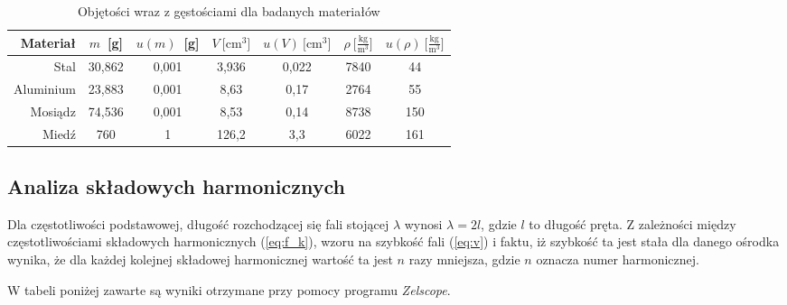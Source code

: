 \documentclass[12pt,a4paper]{article}
\numberwithin{equation}{section}
\begin{document}
\begin{table}[!ht]
	\caption{Objętości wraz z gęstościami dla badanych materiałów}
	\begin{center}
		\begin{tabular}{r|c|c|c|c|c|c}
			\hline  \rule{0pt}{18pt} 
			Materiał & $m$~[g] & $u(m)$~[g] & $V~\big[\textrm{cm}^3\big]$ & $u(V)~\big[\textrm{cm}^3\big]$ & $\rho~\Big[\frac{\textrm{kg}}{\textrm{m}^3}\Big]$ & $u(\rho)~\Big[\frac{\textrm{kg}}{\textrm{m}^3}\Big]$ \\[3pt] \hline \hline
			Stal & 30,862 & 0,001 & 3,936 & 0,022 & 7840 & 44  \\
			Aluminium & 23,883 & 0,001 & 8,63 & 0,17 &  2764 & 55  \\
			Mosiądz & 74,536 & 0,001 &  8,53 & 0,14 & 8738 & 150   \\
			Miedź & 760 & 1 & 126,2 & 3,3 & 6022  & 161 \\ \hline
		\end{tabular}
	\end{center}
	\label{tab:tab1}
\end{table}

\subsection{Analiza składowych harmonicznych}

Dla częstotliwości podstawowej, długość rozchodzącej się fali stojącej $\lambda$ wynosi $\lambda = 2l$, gdzie $l$ to długość pręta. Z zależności między częstotliwościami składowych harmonicznych (\ref{eq:f_k}), wzoru na szybkość fali (\ref{eq:v}) i faktu, iż szybkość ta jest stała dla danego ośrodka wynika, że dla każdej kolejnej składowej harmonicznej wartość ta jest $n$ razy mniejsza, gdzie $n$ oznacza numer harmonicznej.

W tabeli poniżej zawarte są wyniki otrzymane przy pomocy programu \emph{Zelscope}.
\end{document}
